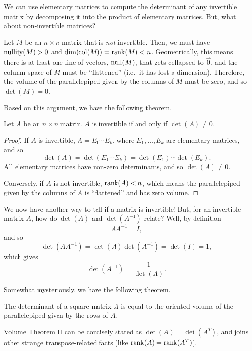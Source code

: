 
We can use elementary matrices to compute the determinant of any invertible matrix by
decomposing it into the product of elementary matrices. But, what about non-invertible matrices?

Let $M$ be an $n\times n$ matrix that is \emph{not} invertible. Then, we must have $\operatorname{nullity}(M)>0$
and $\operatorname{dim}(\operatorname{col}(M))=\operatorname{rank}(M)<n$. Geometrically, this means there is at least one line of vectors, $\operatorname{null}(M)$, that gets
collapsed to $\vec 0$, and the column space of $M$ must be ``flattened'' (i.e., it has lost a dimension). 
Therefore, the volume of the parallelepiped given by the columns of $M$ must be zero, and so $\det(M)=0$.

Based on this argument, we have the following theorem.
\begin{theorem}
	Let $A$ be an $n\times n$ matrix. $A$ is invertible if and only if $\det(A)\neq 0$.
\end{theorem}
\begin{proof}
	If $A$ is invertible, $A=E_1\cdots E_k$, where $E_1,\ldots,E_k$ are elementary matrices,
	and so
	\[
		\det(A)=\det(E_1\cdots E_k) = \det(E_1)\cdots \det(E_k).
	\]
	All elementary matrices have non-zero determinants,
	and so $\det(A)\neq 0$.

	Conversely, if $A$ is not invertible, $\operatorname{rank}(A)<n$, which means the parallelepiped 
	given by the columns of $A$ is ``flattened'' and has zero volume.
\end{proof}

We now have another way to tell if a matrix is invertible! But, for an invertible matrix $A$,
how do $\det(A)$ and $\det(A^{-1})$ relate?  Well, by definition
\[
	AA^{-1}=I,
\]
and so
\[
	\det(AA^{-1})=\det(A)\det(A^{-1})=
	\det(I)=1,
\]
which gives
\[
	\det(A^{-1})=\frac{1}{\det(A)}.
\]


Somewhat mysteriously, we have the following theorem.
\begin{theorem}
	The determinant of a square matrix $A$ is equal to the oriented volume of the parallelepiped
	given by the rows of $A$.
\end{theorem}

Volume Theorem II can be concisely stated as $\det(A)=\det(A^T)$, and joins other
strange transpose-related facts (like $\operatorname{rank}(A)=\operatorname{rank}(A^T)$).


